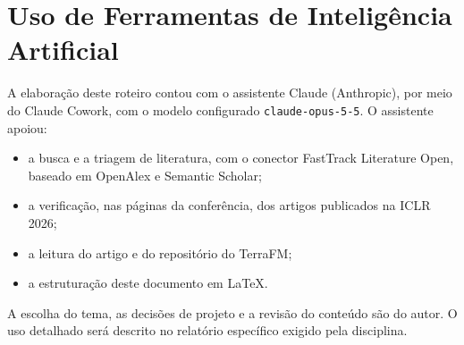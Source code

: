 \documentclass[conference]{IEEEtran}
\begin{document}
\section*{Uso de Ferramentas de Inteligência Artificial}

A elaboração deste roteiro contou com o assistente Claude (Anthropic), por meio do Claude Cowork, com o modelo configurado \texttt{claude-opus-5-5}. O assistente apoiou:
\begin{itemize}
\item a busca e a triagem de literatura, com o conector FastTrack Literature Open, baseado em OpenAlex e Semantic Scholar;
\item a verificação, nas páginas da conferência, dos artigos publicados na ICLR 2026;
\item a leitura do artigo e do repositório do TerraFM;
\item a estruturação deste documento em \LaTeX.
\end{itemize}
A escolha do tema, as decisões de projeto e a revisão do conteúdo são do autor. O uso detalhado será descrito no relatório específico exigido pela disciplina.
\end{document}
